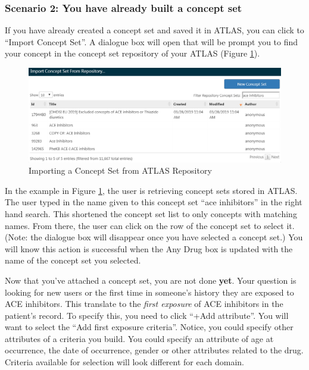 \documentclass[11pt]{book}
\theoremstyle{definition}
\theoremstyle{definition}
\theoremstyle{definition}
\theoremstyle{remark}
\begin{document}
\hypertarget{scenario-2-you-have-already-built-a-concept-set}{%
\subsubsection*{Scenario 2: You have already built a concept set}\label{scenario-2-you-have-already-built-a-concept-set}}

If you have already created a concept set and saved it in ATLAS, you can click to ``Import Concept Set''. A dialogue box will open that will be prompt you to find your concept in the concept set repository of your ATLAS (Figure \ref{fig:ATLASfindyourconcept}).

\begin{figure}

{\centering \includegraphics[width=1\linewidth]{images/Cohorts/ATLAS-findingyourconcept} 

}

\caption{Importing a Concept Set from ATLAS Repository}\label{fig:ATLASfindyourconcept}
\end{figure}

In the example in Figure \ref{fig:ATLASfindyourconcept}, the user is retrieving concept sets stored in ATLAS. The user typed in the name given to this concept set ``ace inhibitors'' in the right hand search. This shortened the concept set list to only concepts with matching names. From there, the user can click on the row of the concept set to select it. (Note: the dialogue box will disappear once you have selected a concept set.) You will know this action is successful when the Any Drug box is updated with the name of the concept set you selected.

Now that you've attached a concept set, you are not done \textbf{yet}. Your question is looking for new users or the first time in someone's history they are exposed to ACE inhibitors. This translate to the \emph{first exposure} of ACE inhibitors in the patient's record. To specify this, you need to click ``+Add attribute''. You will want to select the ``Add first exposure criteria''. Notice, you could specify other attributes of a criteria you build. You could specify an attribute of age at occurrence, the date of occurrence, gender or other attributes related to the drug. Criteria available for selection will look different for each domain.
\end{document}

